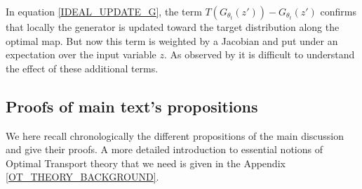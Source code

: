 \documentclass[runningheads]{llncs}
\newcommand\mycitet[1]{\cite{#1}}
\begin{document}
In equation \eqref{IDEAL_UPDATE_G}, the term $T(G_{\theta_t}(z'))-G_{\theta_t}(z')$ confirms that locally the generator is updated toward the target distribution along the optimal map. But now this term is weighted by a Jacobian and put under an expectation over the input variable $z$. As observed by \mycitet{lui2017implicit} it is difficult to understand the effect of these additional terms.

\subsection{Proofs of main text's propositions}
\label{sec:proofs_main_text}
We here recall chronologically the different propositions of the main discussion and give their proofs. A more detailed introduction to essential notions of Optimal Transport theory that we need is given in the Appendix \ref{OT_THEORY_BACKGROUND}. 
\end{document}
